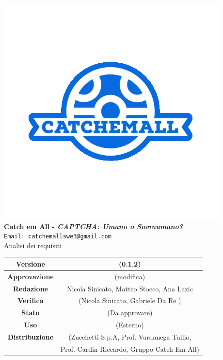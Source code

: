 \begin{titlepage}
\begin{center}
	\includegraphics[scale = 1.5]{img/logo.png}\\
	\bigskip
	\large \textbf{Catch em All - \textit{CAPTCHA: Umano o Sovraumano?}}\\
	\texttt{Email: catchemallswe3@gmail.com}\\
	\vfill
	{\fontsize{1.5cm}{0}\selectfont Analisi dei requisiti}\\
	\vfill
	\begin{tabularx}{\textwidth}{| c | c |}
		\hline
		\textbf{Versione} & (0.1.2)\\
		\hline
		\textbf{Approvazione} & (modifica)\\
		\hline
		\textbf{Redazione} & Nicola Sinicato, Matteo Stocco, Ana Lazic\\
		\hline
		\textbf{Verifica} & (Nicola Sinicato, Gabriele Da Re )\\
		\hline
		\textbf{Stato} & (Da approvare)\\
		\hline
		\textbf{Uso} & (Esterno)\\
		\hline
		\textbf{Distribuzione} & (Zucchetti S.p.A, Prof. Vardanega Tullio, \\
		&  Prof. Cardin Riccardo, Gruppo Catch Em All)\\
		\hline
	\end{tabularx}
\end{center}
\end{titlepage}